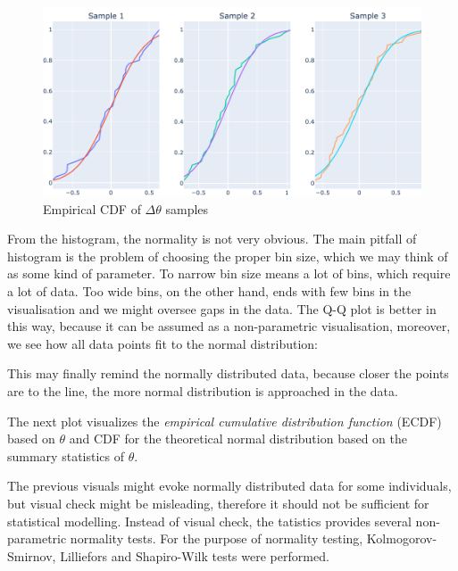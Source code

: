 \documentclass[
  digital, %
  oneside, %
  lof,     %
  lot,     %
]{fithesis4}
\begin{document}
\begin{figure}[h]
  \begin{center}
    \includegraphics[width=\textwidth]{images/theta-diff-ecdf.png}
  \end{center}
  \caption{Empirical CDF of $\Delta \theta$ samples}
  \label{fig:theta-diff-ecdf}
\end{figure}

From the histogram, the normality is not 
very obvious. 
The main pitfall of histogram is the problem 
of choosing the proper bin size, which we may 
think of as some kind of parameter. 
To narrow bin size means a lot of bins, which 
require a lot of data. 
Too wide bins, on the other hand, ends with 
few bins in the visualisation and we might 
oversee gaps in the data. 
The Q-Q plot is better in this way, because 
it can be assumed as a non-parametric 
visualisation, moreover, we see how all data 
points fit to the normal distribution:

This may finally remind the normally distributed 
data, because closer the points are to the line, 
the more normal distribution is approached in 
the data.

The next plot visualizes the 
\textit{empirical cumulative distribution function}
(ECDF) based on $\theta$ and CDF for the 
theoretical normal distribution based on 
the summary statistics of $\theta$.

The previous visuals might evoke normally 
distributed data for some individuals, but 
visual check might be misleading, therefore 
it should not be sufficient for statistical 
modelling. Instead of visual check, the 
tatistics provides several non-parametric 
normality tests. For the purpose of normality 
testing, Kolmogorov-Smirnov, Lilliefors and 
Shapiro-Wilk tests were performed.




\end{document}
